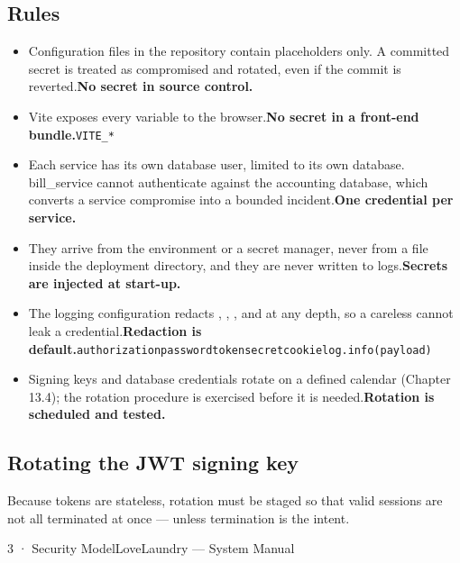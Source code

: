 \documentclass[11pt,a4paper,oneside]{book}
\begin{document}
\subsection*{Rules}
\begin{itemize}
\item Configuration files in the repository contain placeholders only. A committed secret is treated as compromised and rotated, even if the commit is reverted.\textbf{No secret in source control.}
\item Vite exposes every  variable to the browser.\textbf{No secret in a front-end bundle.}\texttt{VITE\_*}
\item Each service has its own database user, limited to its own database. bill\_service cannot authenticate against the accounting database, which converts a service compromise into a bounded incident.\textbf{One credential per service.}
\item They arrive from the environment or a secret manager, never from a file inside the deployment directory, and they are never written to logs.\textbf{Secrets are injected at start-up.}
\item The logging configuration redacts , , ,  and  at any depth, so a careless  cannot leak a credential.\textbf{Redaction is default.}\texttt{authorization}\texttt{password}\texttt{token}\texttt{secret}\texttt{cookie}\texttt{log.info(payload)}
\item Signing keys and database credentials rotate on a defined calendar (Chapter 13.4); the rotation procedure is exercised before it is needed.\textbf{Rotation is scheduled and tested.}
\end{itemize}
\subsection*{Rotating the JWT signing key}
Because tokens are stateless, rotation must be staged so that valid sessions are not all terminated at once — unless termination is the intent.

3 · Security ModelLoveLaundry — System Manual
\end{document}
